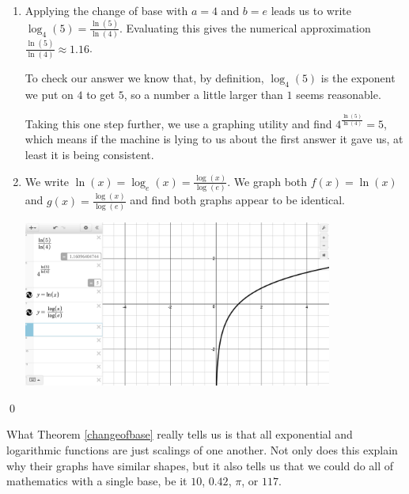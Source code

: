 \documentclass{ximera}
\begin{document}
\begin{ex}
\begin{enumerate}
\begin{center}
\end{center}

\item  Applying the change of base with $a=4$ and $b=e$ leads us to write $\log_{4}(5) = \frac{\ln(5)}{\ln(4)}$.  Evaluating this gives the numerical approximation  $\frac{\ln(5)}{\ln(4)} \approx 1.16$. 

\smallskip

To check our answer we know that,  by definition, $\log_{4}(5)$ is the exponent we put on $4$ to get $5$, so a number a little larger than $1$ seems reasonable.

\smallskip

Taking this one step further, we use a graphing utility and find $4^{ \frac{\ln(5)}{\ln(4)}} = 5$, which means if  the machine  is lying to us about the first answer it gave us, at least it is being consistent.

\item  We write $\ln(x) = \log_{e}(x) = \frac{\log(x)}{\log(e)}$.  We graph both $f(x) = \ln(x)$ and $g(x) = \frac{\log(x)}{\log(e)}$ and find both graphs appear to be identical.

\begin{center}

\includegraphics[width=4in]{./PropertiesofLogarithmsGraphics/LogProps02.jpg} 

\end{center}

\end{enumerate}

 \qed

\end{ex}

What Theorem \ref{changeofbase} really tells us is that all exponential and logarithmic functions are just scalings of one another.  Not only does this explain why their graphs have similar shapes, but it also tells us that we could do all of mathematics with a single base,  be it $10$, $0.42$, $\pi$, or $117$. 
\end{document}
